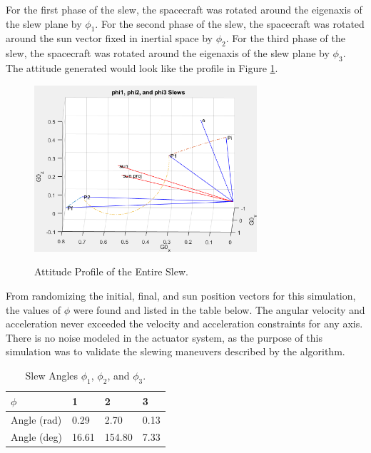 \documentclass[letterpaper, preprint, paper,11pt]{AAS}	%
\begin{document}
		For the first phase of the slew, the spacecraft was rotated around the eigenaxis of the slew plane by $\phi_1$. For the second phase of the slew, the spacecraft was rotated around the sun vector fixed in inertial space by $\phi_2$. For the third phase of the slew, the spacecraft was rotated around the eigenaxis of the slew plane by $\phi_3$. The attitude generated would look like the profile in Figure \ref{fig:phi1_phi2_phi3}. 		
			\begin{figure}[H]
\begin{center}
				\label{fig:phi1_phi2_phi3}
				\includegraphics[width=3.25in]{figures/alphaNot0/phi1_phi2_phi3.png}
				\caption{Attitude Profile of the Entire Slew.}
\end{center}		
	\end{figure}	
From randomizing the initial, final, and sun position vectors for this simulation, the values of $\phi$ were found and listed in the table below. The angular velocity and acceleration never exceeded the velocity and acceleration constraints for any axis. There is no noise modeled in the actuator system, as the purpose of this simulation was to validate the slewing maneuvers described by the algorithm. 
				\begin{table}[H]
					\centering
					\caption{Slew Angles $\phi_1$, $\phi_2$, and $\phi_3$.}
					\begin{tabular}{llll}
						\toprule
						\midrule
						$\phi$ & 1 & 2 & 3 \\
						\midrule
						Angle (rad) & 0.29 & 2.70 & 0.13 \\
						Angle (deg) & 16.61 & 154.80 & 7.33 \\ 
						\midrule
						\bottomrule
					\end{tabular}%
					\label{tab:FOG_SF}%
				\end{table}%
		
\end{document}
